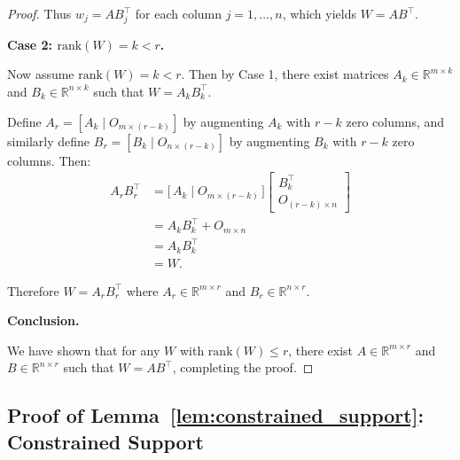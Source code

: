 \documentclass{article}
\theoremstyle{plain}
\theoremstyle{definition}
\theoremstyle{remark}
\begin{document}
\begin{proof}
Thus $w_j = A B_j^\top$ for each column $j = 1, \ldots, n$, which yields $W = AB^\top$.

\textbf{Case 2: $\mathrm{rank}(W) = k < r$.}

Now assume $\mathrm{rank}(W) = k < r$. Then by Case 1, there exist matrices $A_k \in \mathbb{R}^{m \times k}$ and $B_k \in \mathbb{R}^{n \times k}$ such that $W = A_k B_k^\top$.

Define $A_r = [A_k \mid O_{m \times (r-k)}]$ by augmenting $A_k$ with $r-k$ zero columns, and similarly define $B_r = [B_k \mid O_{n \times (r-k)}]$ by augmenting $B_k$ with $r-k$ zero columns. Then:
\[
\begin{aligned}
A_r B_r^\top
&= \bigl[\,A_k \mid O_{m \times (r-k)}\,\bigr]
\begin{bmatrix}
B_k^\top \\
O_{(r-k)\times n}
\end{bmatrix} \\
&= A_k B_k^\top + O_{m\times n} \\
&= A_k B_k^\top \\
&= W.
\end{aligned}
\]

Therefore $W = A_r B_r^\top$ where $A_r \in \mathbb{R}^{m \times r}$ and $B_r \in \mathbb{R}^{n \times r}$.

\textbf{Conclusion.}

We have shown that for any $W$ with $\mathrm{rank}(W) \leq r$, there exist $A \in \mathbb{R}^{m \times r}$ and $B \in \mathbb{R}^{n \times r}$ such that $W = AB^\top$, completing the proof.
\end{proof}

\subsection{Proof of Lemma~\ref{lem:constrained_support}: Constrained Support}\label{app:constrained_support}
\end{document}
